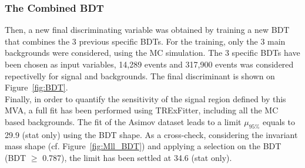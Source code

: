 \subsubsection{The Combined BDT}
Then, a new final discriminating variable was obtained by training a
new BDT that combines the 3 previous specific BDTs. For the training,
only the 3 main backgrounds were considered, using the MC
simulation. The 3 specific BDTs have been chosen as input variables,
14,289 events and 317,900 events was considered repectivelly for
signal and backgrounds. The final discriminant is shown on Figure~\ref{fig:BDT}.\\  
Finally, in order to quantify the sensitivity of the signal region
defined by this MVA, a full fit has been performed using TRExFitter,
including all the MC based backgrounds. The fit of the Asimov dataset
leads  to a limit $\mu_{95\%}$ equals to 29.9 (stat only) using 
the BDT shape.
As a cross-check, considering the invariant mass shape
(cf. Figure~\ref{fig:Mll_BDT}) and applying a selection on the BDT
(BDT $\geq$ 0.787), the limit has been settled at 34.6 (stat only).

